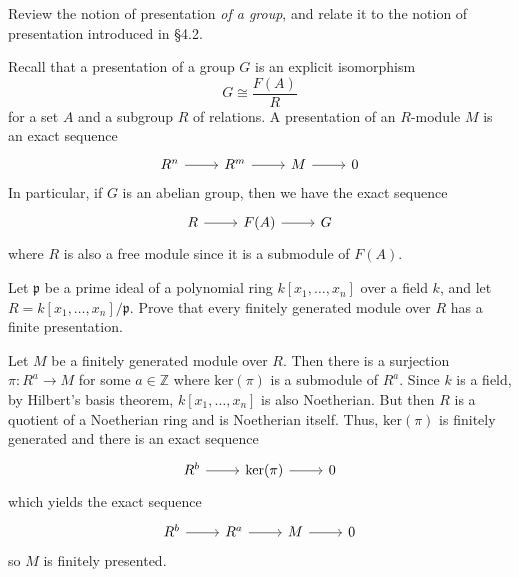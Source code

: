 \documentclass[../../master.tex]{subfiles}
\begin{document}
\begin{problem}
    Review the notion of presentation \textit{of a group}, and relate it to the notion of presentation introduced in \S 4.2.
\end{problem}

\begin{solution}
    Recall that a presentation of a group $G$ is an explicit isomorphism
    \[
        G \cong \frac{F(A)}{R}
    \]
    for a set $A$ and a subgroup $R$ of relations.
    A presentation of an $R$-module $M$ is an exact sequence
    \[
    \begin{tikzcd}
        R^{n} & R^{m} & M & 0
        \arrow[from=1-1, to=1-2]
        \arrow[from=1-2, to=1-3] 
        \arrow[from=1-3, to=1-4] 
    \end{tikzcd}
    \]
    In particular, if $G$ is an abelian group, then we have the exact sequence
    \[
    \begin{tikzcd}
        R & F(A) & G
        \arrow[from=1-1, to=1-2] 
        \arrow[from=1-2, to=1-3] 
    \end{tikzcd}
    \]
    where $R$ is also a free module since it is a submodule of $F(A)$.
\end{solution}

\begin{problem}
    Let $\mathfrak{p}$ be a prime ideal of a polynomial ring $k[x_1, \ldots, x_n]$ over a field $k$, and let $R = k[x_1, \ldots, x_n] / \mathfrak{p}$.
    Prove that every finitely generated module over $R$ has a finite presentation.
\end{problem}

\begin{solution}
    Let $M$ be a finitely generated module over $R$.
    Then there is a surjection $\pi: R^{a} \to M$ for some $a \in \mathbb{Z}$ where $\text{ker}(\pi)$ is a submodule of $R^{a}$.
    Since $k$ is a field, by Hilbert's basis theorem, $k[x_1, \ldots, x_n]$ is also Noetherian.
    But then $R$ is a quotient of a Noetherian ring and is Noetherian itself.
    Thus, $\text{ker}(\pi)$ is finitely generated and there is an exact sequence
    \[
    \begin{tikzcd}
        R^{b} & \text{ker}(\pi) & 0
        \arrow[from=1-1, to=1-2] 
        \arrow[from=1-2, to=1-3] 
    \end{tikzcd}
    \]
    which yields the exact sequence
    \[
    \begin{tikzcd}
        R^{b} & R^{a} & M & 0
        \arrow[from=1-1, to=1-2] 
        \arrow[from=1-2, to=1-3] 
        \arrow[from=1-3, to=1-4] 
    \end{tikzcd}
    \]
    so $M$ is finitely presented.
\end{solution}
\end{document}
